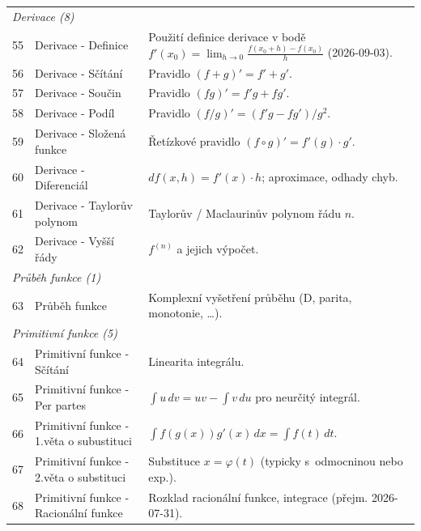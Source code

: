 \documentclass[11pt,a4paper]{article}
\begin{document}
\begin{longtable}{p{1cm}p{6cm}p{8.5cm}}
  \multicolumn{3}{l}{\textit{Derivace (8)}} \\[2pt]
  55 & Derivace - Definice                     & Použití definice derivace v bodě $f'(x_0) = \lim_{h \to 0}\frac{f(x_0+h)-f(x_0)}{h}$ (2026-09-03). \\
  56 & Derivace - Sčítání                      & Pravidlo $(f+g)' = f'+g'$. \\
  57 & Derivace - Součin                       & Pravidlo $(fg)' = f'g + fg'$. \\
  58 & Derivace - Podíl                        & Pravidlo $(f/g)' = (f'g-fg')/g^2$. \\
  59 & Derivace - Složená funkce               & Řetízkové pravidlo $(f \circ g)' = f'(g) \cdot g'$. \\
  60 & Derivace - Diferenciál                  & $df(x,h) = f'(x)\cdot h$; aproximace, odhady chyb. \\
  61 & Derivace - Taylorův polynom             & Taylorův / Maclaurinův polynom řádu $n$. \\
  62 & Derivace - Vyšší řády                   & $f^{(n)}$ a jejich výpočet. \\[4pt]

  \multicolumn{3}{l}{\textit{Průběh funkce (1)}} \\[2pt]
  63 & Průběh funkce                           & Komplexní vyšetření průběhu (D, parita, monotonie, …). \\[4pt]

  \multicolumn{3}{l}{\textit{Primitivní funkce (5)}} \\[2pt]
  64 & Primitivní funkce - Sčítání             & Linearita integrálu. \\
  65 & Primitivní funkce - Per partes          & $\int u\, dv = uv - \int v\, du$ pro neurčitý integrál. \\
  66 & Primitivní funkce - 1.věta o subustituci & $\int f(g(x)) g'(x)\, dx = \int f(t)\, dt$. \\
  67 & Primitivní funkce - 2.věta o substituci & Substituce $x = \varphi(t)$ (typicky s~odmocninou nebo exp.). \\
  68 & Primitivní funkce - Racionální funkce   & Rozklad racionální funkce, integrace (přejm. 2026-07-31). \\[4pt]


\end{longtable}
\end{document}
